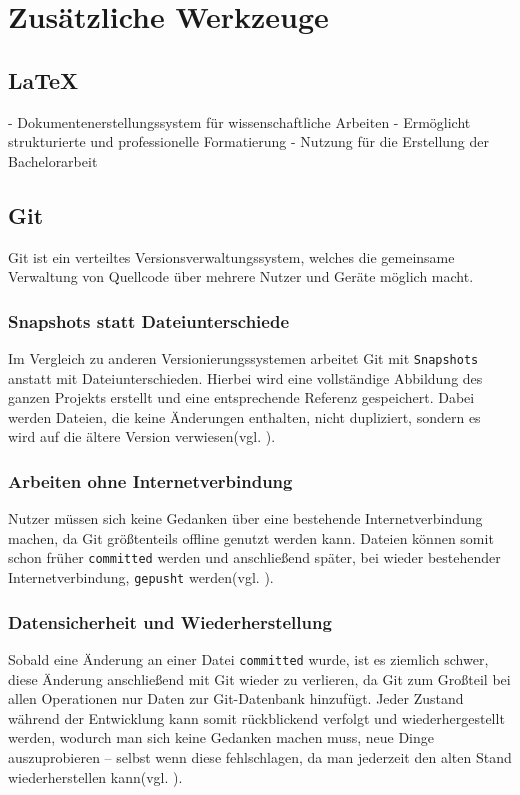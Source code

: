 \documentclass[oneside]{ausarbeitung}
\begin{document}
\section{Zusätzliche Werkzeuge}

\subsection{LaTeX}
- Dokumentenerstellungssystem für wissenschaftliche Arbeiten  
- Ermöglicht strukturierte und professionelle Formatierung  
- Nutzung für die Erstellung der Bachelorarbeit  

\subsection{Git}

Git ist ein verteiltes Versionsverwaltungssystem, welches die gemeinsame Verwaltung von Quellcode über mehrere Nutzer und Geräte möglich macht.  

\subsubsection{Snapshots statt Dateiunterschiede}
Im Vergleich zu anderen Versionierungssystemen arbeitet Git mit \texttt{Snapshots} anstatt mit Dateiunterschieden. Hierbei wird eine vollständige Abbildung des ganzen Projekts erstellt und eine entsprechende Referenz gespeichert. Dabei werden Dateien, die keine Änderungen enthalten, nicht dupliziert, sondern es wird auf die ältere Version verwiesen(vgl. \parencite{what is git?}).  

\subsubsection{Arbeiten ohne Internetverbindung}
Nutzer müssen sich keine Gedanken über eine bestehende Internetverbindung machen, da Git größtenteils offline genutzt werden kann. Dateien können somit schon früher \texttt{committed} werden und anschließend später, bei wieder bestehender Internetverbindung, \texttt{gepusht} werden(vgl. \parencite{what is git?}).  

\subsubsection{Datensicherheit und Wiederherstellung}
Sobald eine Änderung an einer Datei \texttt{committed} wurde, ist es ziemlich schwer, diese Änderung anschließend mit Git wieder zu verlieren, da Git zum Großteil bei allen Operationen nur Daten zur Git-Datenbank hinzufügt. Jeder Zustand während der Entwicklung kann somit rückblickend verfolgt und wiederhergestellt werden, wodurch man sich keine Gedanken machen muss, neue Dinge auszuprobieren – selbst wenn diese fehlschlagen, da man jederzeit den alten Stand wiederherstellen kann(vgl. \parencite{what is git?}).  
\end{document}
